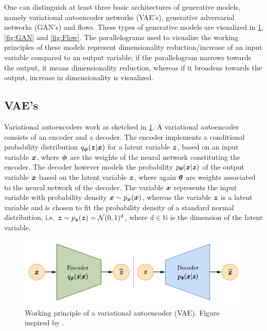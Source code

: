 \documentclass[a4paper,12pt]{report}
\begin{document}
One can distinguish at least three basic architectures of generative models, namely variational autoencoder networks (VAE's), generative adversarial networks (GAN's) and flows. These types of generative models are visualized in \cref{fig:VAE}, \cref{fig:GAN} and \cref{fig:Flow}. The parallelograms used to visualize the working principles of these models represent dimensionality reduction/increase of an input variable compared to an output variable; if the parallelogram narrows towards the output, it means dimensionality reduction, whereas if it broadens towards the output, increase in dimensionality is visualized.
\subsection{VAE's}
Variational autoencoders work as sketched in \cref{fig:VAE}. A variational autoencoder consists of an encoder and a decoder. The encoder implements a conditional probability distribution $q_{\bm{\phi}}(\bm{z}|\bm{x})$ for a latent variable $\bm{z}$, based on an input variable $\bm{x}$, where $\bm{\phi}$ are the weights of the neural network constituting the encoder. The decoder however models the probability $p_{\bm{\theta}}(\bm{x}|\bm{z})$ of the output variable $\bm{x}$ based on the latent variable $\bm{z}$, where again $\bm{\theta}$ are weights associated to the neural network of the decoder. The variable $\bm{x}$ represents the input variable with probability density $\bm{x} \sim p_{\bm{x}}(\bm{x})$, whereas the variable $\bm{z}$ is a latent variable and is chosen to fit the probability density of a standard normal distribution, i.e. $\bm{z}\sim p_{\bm{z}}(\bm{z}) = \mathcal{N}(0,1)^d$, where $d \in \mathbb{N}$ is the dimension of the latent variable.
\begin{figure}[h!]
\centering
\includegraphics[width=\linewidth-4cm]{figures/VAE.pdf}
\caption{Working principle of a variational autoencoder (VAE). Figure inspired by \cite{weng2018flow}.}
\label{fig:VAE}
\end{figure}
\end{document}
